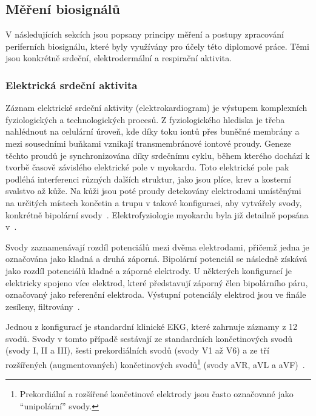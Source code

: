 \subsection{Měření biosignálů}
\label{subsec:srdecni_aktivita}
V následujících sekcích jsou popsany principy měření a postupy zpracování
periferních biosignálu, které byly využívány pro účely této diplomové práce.
Těmi jsou konkrétně srdeční, elektrodermální a respirační aktivita.

\subsubsection{Elektrická srdeční aktivita}
Záznam elektrické srdeční aktivity (elektrokardiogram) je výstupem komplexních
fyziologických a technologických procesů. Z fyziologického hlediska je třeba
nahlédnout na celulární úroveň, kde díky toku iontů přes buněčné membrány a mezi
sousedními buňkami vznikají transmembránové iontové proudy. Geneze těchto proudů
je synchronizována díky srdečnímu cyklu, během kterého dochází k tvorbě časově
závislého elektrické pole v myokardu. Toto elektrické pole pak podléhá
interferenci různých dalších struktur, jako jsou plíce, krev a kosterní svalstvo
až kůže. Na kůži jsou poté proudy detekovány elektrodami umístěnými na určitých
místech končetin a trupu v takové konfiguraci, aby vytvářely svody, konkrétně
bipolární svody~\cite{mirvis2001}. Elektrofyziologie myokardu byla již detailně
popsána v~\cite{Goldberger2017,Cihak2016,Stejfa2006,Weinhaus2005}.

Svody zaznamenávají rozdíl potenciálů mezi dvěma elektrodami, přičemž jedna je
označována jako kladná a druhá záporná. Bipolární potenciál se následně získává
jako rozdíl potenciálů kladné a záporné elektrody. U některých konfigurací je
elektricky spojeno více elektrod, které představují záporný člen bipolárního
páru, označovaný jako referenční elektroda. Výstupní potenciály elektrod jsou ve
finále zesíleny, filtrovány~\cite{Goldberger2017,mirvis2001}.

Jednou z konfigurací je standardní klinické EKG, které zahrnuje záznamy z 12
svodů. Svody v tomto případě sestávají ze standardních končetinových svodů
(svody I, II a III), šesti prekordiálních svodů (svody V1 až V6) a ze tří
rozšířených (augmentovaných) končetinových svodů\footnote{Prekordiální a
    rozšířené končetinové elektrody jsou často označované jako \enquote{unipolární}
    svody.} (svody aVR, aVL a aVF)~\cite{Goldberger2017,mirvis2001}.

